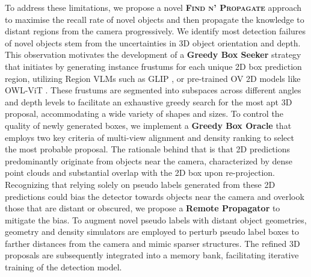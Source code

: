 To address these limitations, we propose a novel \textbf{\textsc{Find n' Propagate}} approach to maximise the recall rate of novel objects and then propagate the knowledge to distant regions from the camera progressively. We identify most detection failures of novel objects stem from the uncertainties in 3D object orientation and depth. This observation motivates the development of a  \textbf{Greedy Box Seeker} strategy that initiates by generating instance frustums for each unique 2D box prediction region, utilizing  Region VLMs such as GLIP \cite{DBLP:conf/cvpr/LiZZYLZWYZHCG22}, or pre-trained OV 2D models like OWL-ViT \cite{DBLP:journals/corr/abs-2205-06230}. These frustums are segmented into subspaces across different angles and depth levels to facilitate an exhaustive greedy search for the most apt 3D proposal,  accommodating a wide variety of shapes and sizes. To control the quality of newly generated boxes, we implement a  \textbf{Greedy Box Oracle} that employs two key criteria of multi-view alignment and density ranking to select the most probable proposal. The rationale behind that is that 2D predictions predominantly originate from objects near the camera, characterized by dense point clouds and substantial overlap with the 2D box upon re-projection. Recognizing that relying solely on pseudo labels generated from these 2D predictions could bias the detector towards objects near the camera and overlook those that are distant or obscured, we propose a  \textbf{Remote Propagator} to mitigate the bias. To augment novel pseudo labels with distant object geometries, geometry and density simulators are employed to perturb pseudo label boxes to farther distances from the camera and mimic sparser structures. The refined 3D proposals are subsequently integrated into a memory bank, facilitating iterative training of the detection model.